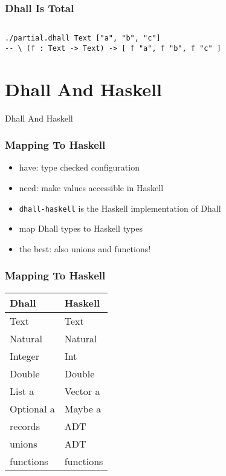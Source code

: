 \documentclass{beamer}
\begin{document}
\begin{frame}[fragile]
  \frametitle{Dhall Is Total}
  \inputminted[fontsize=\scriptsize]{text}{dhall/partial.dhall}
  \begin{verbatim}
./partial.dhall Text ["a", "b", "c"]
-- \ (f : Text -> Text) -> [ f "a", f "b", f "c" ]
  \end{verbatim}
\end{frame}

\section{Dhall And Haskell}

\begin{frame}
  \begin{center}
    {\Huge Dhall And Haskell}
  \end{center}
\end{frame}

\begin{frame}
  \frametitle{Mapping To Haskell}
  \begin{itemize}
  \item have: type checked configuration
  \item need: make values accessible in Haskell
  \item \texttt{dhall-haskell} is the Haskell implementation of Dhall
  \item map Dhall types to Haskell types
  \item the best: also unions and functions!
  \end{itemize}
\end{frame}

\begin{frame}
  \frametitle{Mapping To Haskell}
  \begin{center}
  \begin{tabular}{l l}
    Dhall & Haskell \\ \hline
    Text & Text \\
    Natural & Natural \\
    Integer & Int \\
    Double & Double \\
    List a & Vector a \\
    Optional a & Maybe a \\
    records & ADT \\
    unions & ADT \\
    functions & functions \\
  \end{tabular}
\end{center}
\end{frame}
\end{document}
